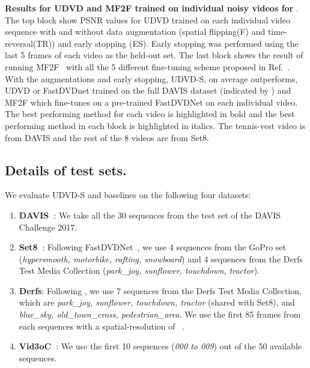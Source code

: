 \documentclass[final]{cvpr}
\begin{document}
\begin{table*}[ht]
        \caption{\textbf{Results for UDVD and MF2F trained on individual noisy videos for }. The top block show PSNR values for UDVD trained on each individual video sequence with and without data augmentation (spatial flipping(F) and time-reversal(TR)) and early stopping (ES). Early stopping was performed using the last 5 frames of each video as the held-out set. The last block shows the result of running MF2F~\cite{mf2f} with all the 5 different fine-tuning scheme proposed in Ref.~\cite{mf2f}. With the augmentations and early stopping, UDVD-S, on average outperforms, UDVD or FastDVDnet trained on the full DAVIS dataset (indicated by ) and MF2F which fine-tunes on a pre-trained FastDVDNet on each individual video. The best performing method for each video is highlighted in bold and the best performing method in each block is highlighted in italics. The tennis-vest video is from DAVIS and the rest of the 8 videos are from Set8. 
        }
    \label{tab:single_video_90}
\end{table*}


\subsection{Details of test sets.}

We evaluate UDVD-S and baselines on the following four datasets:

\begin{enumerate}
    \item \textbf{DAVIS~\cite{davis}}: We take all the 30 sequences from the test set of the DAVIS Challenge 2017.
    \item \textbf{Set8~\cite{fastdvdnet}}: Following FastDVDNet~\cite{fastdvdnet}, we use 4 sequences from the GoPro set (\textit{hypersmooth, motorbike, rafting, snowboard}) and 4 sequences from the Derfs Test Media Collection (\textit{park\_joy, sunflower, touchdown, tractor}).
    \item \textbf{Derfs}: Following \cite{mf2f}, we use 7 sequences from the Derfs Test Media Collection, which are  \textit{park\_joy, sunflower, touchdown, tractor} (shared with Set8), and \textit{blue\_sky, old\_town\_cross, pedestrian\_area}. We use the first 85 frames from each sequences with a spatial-resolution of ~\cite{fastdvdnet}. 
    \item \textbf{Vid3oC~\cite{vid3oc}}: We use the first 10 sequences (\textit{000 to 009}) out of the 50 available sequences.
\end{enumerate}
\end{document}
